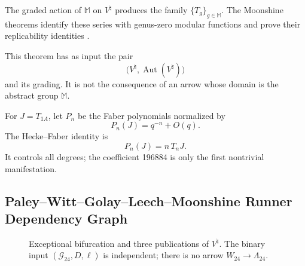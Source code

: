\begin{theorem}
\label{p12-83-c20-s8:thm:moonshine-monstruoso-u031}
The graded action of \(\mathbb M\) on \(V^\natural\) produces the family
\(\{T_g\}_{g\in\mathbb M}\). The Moonshine theorems identify these
series with genus-zero modular functions and prove their replicability
identities
\cite{ConwayNorton1979,Borcherds1992,FLM1988}.
\end{theorem}

This theorem has as input the pair
\[
 \bigl(V^\natural,\operatorname{Aut}(V^\natural)\bigr)
\]
and its grading. It is not the consequence of an arrow whose domain is the
abstract group \(\mathbb M\).

For \(J=T_{1A}\), let \(P_n\) be the Faber polynomials normalized by
\[
 P_n(J)=q^{-n}+O(q).
\]
The Hecke--Faber identity is
\begin{equation}
 P_n(J)=n\,T_nJ.
 \label{p12-83-c20-s8:eq:hecke-faber-u031}
\end{equation}
It controls all degrees; the coefficient 196884 is only the first
nontrivial manifestation.

\subsection{Paley–Witt–Golay–Leech–Moonshine Runner Dependency Graph}

\begin{figure}[htbp]
\centering
{}
\caption{Exceptional bifurcation and three publications of
\(V^\natural\). The binary input \((\mathcal G_{24},D,\ell)\) is
independent; there is no arrow \(W_{24}\to\Lambda_{24}\).}
\label{p12-83-c20-s8:fig:grafo-excepcional-moonshine-u031}
\end{figure}


